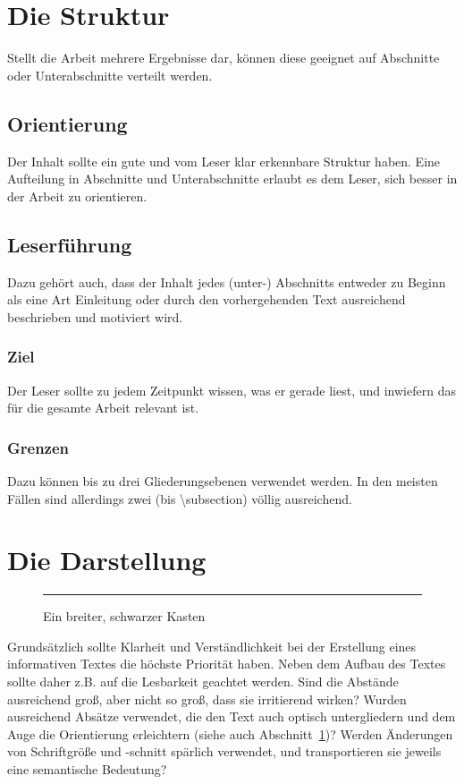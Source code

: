 \documentclass[draft]{tcs-seminar}
\begin{document}
\section{Die Struktur}
\label{sec:struktur}

Stellt die Arbeit mehrere Ergebnisse dar,
können diese geeignet auf Abschnitte oder Unterabschnitte verteilt werden.

\subsection{Orientierung}

Der Inhalt sollte ein gute und vom Leser klar erkennbare Struktur haben.
Eine Aufteilung in Abschnitte und Unterabschnitte erlaubt es dem Leser,
sich besser in der Arbeit zu orientieren.

\subsection{Leserführung}

Dazu gehört auch, dass der Inhalt jedes (unter-) Abschnitts
entweder zu Beginn als eine Art Einleitung
oder durch den vorhergehenden Text ausreichend beschrieben und motiviert wird.

\subsubsection{Ziel}

Der Leser sollte zu jedem Zeitpunkt wissen,
was er gerade liest, und inwiefern das für die gesamte Arbeit relevant ist.

\subsubsection{Grenzen}

Dazu können bis zu drei Gliederungsebenen verwendet werden.
In den meisten Fällen sind allerdings zwei
(bis \textsf{\textbackslash subsection}) völlig ausreichend.


\section{Die Darstellung}

\begin{figure*}[t]
  \centering
  \rule{12cm}{2cm}
  \caption{Ein breiter, schwarzer Kasten}
  \label{abb:breiter-kasten}
\end{figure*}
Grundsätzlich sollte Klarheit und Verständlichkeit bei der Erstellung eines
informativen Textes die höchste Priorität haben.
Neben dem Aufbau des Textes sollte daher
z.B. auf die Lesbarkeit geachtet werden.
Sind die Abstände ausreichend groß,
aber nicht so groß, dass sie irritierend wirken?
Wurden ausreichend Absätze verwendet, die den Text auch optisch untergliedern
und dem Auge die Orientierung erleichtern (siehe auch Abschnitt~\ref{sec:struktur})?
Werden Änderungen von Schriftgröße und -schnitt spärlich verwendet,
und transportieren sie jeweils eine semantische Bedeutung?
\end{document}
